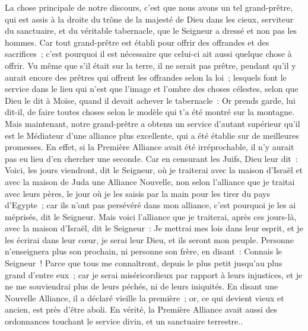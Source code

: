 \begin{multicols}{2}
\VerseOne{}La chose principale de notre discours, c'est que nous avons un tel grand-prêtre, qui est assis à la droite du trône de la majesté de Dieu dans les cieux,
serviteur du sanctuaire, et du véritable tabernacle, que le Seigneur a dressé et non pas les hommes.
Car tout grand-prêtre est établi pour offrir des offrandes et des sacrifices~; c'est pourquoi il est nécessaire que celui-ci ait aussi quelque chose à offrir.
Vu même que s'il était sur la terre, il ne serait pas prêtre, pendant qu'il y aurait encore des prêtres qui offrent les offrandes selon la loi~;
lesquels font le service dans le lieu qui n'est que l'image et l'ombre des choses célestes, selon que Dieu le dit à Moïse, quand il devait achever le tabernacle~: Or prends garde, lui dit-il, de faire toutes choses selon le modèle qui t'a été montré sur la montagne.
Mais maintenant, notre grand-prêtre a obtenu un service d'autant supérieur qu'il est le Médiateur d'une alliance plus excellente, qui a été établie sur de meilleures promesses.
En effet, si la Première Alliance avait été irréprochable, il n'y aurait pas eu lieu d'en chercher une seconde.
Car en censurant les Juifs, Dieu leur dit~: Voici, les jours viendront, dit le Seigneur, où je traiterai avec la maison d'Israël et avec la maison de Juda une Alliance Nouvelle,
non selon l'alliance que je traitai avec leurs pères, le jour où je les saisis par la main pour les tirer du pays d'Egypte~; car ils n'ont pas persévéré dans mon alliance, c'est pourquoi je les ai méprisés, dit le Seigneur.
Mais voici l'alliance que je traiterai, après ces jours-là, avec la maison d'Israël, dit le Seigneur~: Je mettrai mes lois dans leur esprit, et je les écrirai dans leur cœur, je serai leur Dieu, et ils seront mon peuple.
Personne n'enseignera plus son prochain, ni personne son frère, en disant~: Connais le Seigneur~! Parce que tous me connaîtront, depuis le plus petit jusqu'au plus grand d'entre eux~;
car je serai miséricordieux par rapport à leurs injustices, et je ne me souviendrai plus de leurs péchés, ni de leurs iniquités.
En disant une Nouvelle Alliance, il a déclaré vieille la première~; or, ce qui devient vieux et ancien, est près d'être aboli.
\VerseOne{}En vérité, la Première Alliance avait aussi des ordonnances touchant le service divin, et un sanctuaire terrestre..

\end{multicols}
